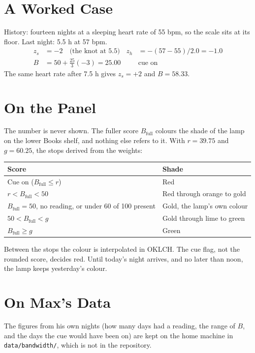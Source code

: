 \documentclass[11pt]{article}
\begin{document}
\section{A Worked Case}
History: fourteen nights at a sleeping heart rate of 55 bpm, so the scale sits at
its floor. Last night: 5.5 h at 57 bpm.
\begin{align*}
z_s &= -2 \quad \text{(the knot at 5.5)} & z_h &= -(57 - 55)/2.0 = -1.0 \\
B &= 50 + \tfrac{25}{3}(-3) = 25.00 & &\text{cue on}
\end{align*}
The same heart rate after 7.5 h gives $z_s = +2$ and $B = 58.33$.

\section{On the Panel}
The number is never shown. The fuller score $B_{\text{full}}$ colours the shade
of the lamp on the lower Books shelf, and nothing else refers to it. With
$r = 39.75$ and $g = 60.25$, the stops derived from the weights:
\begin{center}
\begin{tabular}{ll}
\toprule
Score & Shade \\
\midrule
Cue on ($B_{\text{full}} \le r$) & Red \\
$r < B_{\text{full}} < 50$ & Red through orange to gold \\
$B_{\text{full}} = 50$, no reading, or under 60 of 100 present & Gold, the lamp's own colour \\
$50 < B_{\text{full}} < g$ & Gold through lime to green \\
$B_{\text{full}} \ge g$ & Green \\
\bottomrule
\end{tabular}
\end{center}
Between the stops the colour is interpolated in OKLCH. The cue flag, not the
rounded score, decides red. Until today's night arrives, and no later than noon,
the lamp keeps yesterday's colour.

\section{On Max's Data}
The figures from his own nights (how many days had a reading, the range of $B$,
and the days the cue would have been on) are kept on the home machine in
\texttt{data/bandwidth/}, which is not in the repository.
\end{document}

